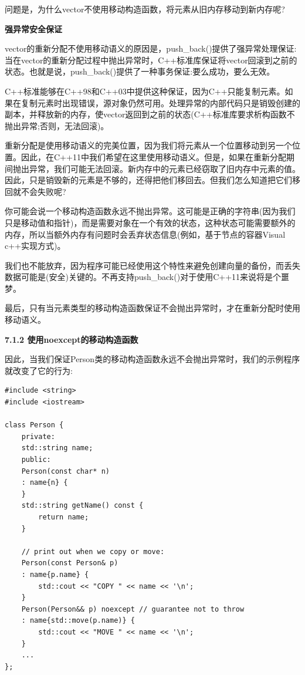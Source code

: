 问题是，为什么vector不使用移动构造函数，将元素从旧内存移动到新内存呢?\par

\hspace*{\fill} \par %
\textbf{强异常安全保证}

vector的重新分配不使用移动语义的原因是，push\_back()提供了强异常处理保证:当在vector的重新分配过程中抛出异常时，C++标准库保证将vector回滚到之前的状态。也就是说，push\_back()提供了一种事务保证:要么成功，要么无效。\par

C++标准能够在C++98和C++03中提供这种保证，因为C++只能复制元素。如果在复制元素时出现错误，源对象仍然可用。处理异常的内部代码只是销毁创建的副本，并释放新的内存，使vector返回到之前的状态(C++标准库要求析构函数不抛出异常;否则，无法回滚)。\par

重新分配是使用移动语义的完美位置，因为我们将元素从一个位置移动到另一个位置。因此，在C++11中我们希望在这里使用移动语义。但是，如果在重新分配期间抛出异常，我们可能无法回滚。新内存中的元素已经窃取了旧内存中元素的值。因此，只是销毁新的元素是不够的，还得把他们移回去。但我们怎么知道把它们移回就不会失败呢?\par

你可能会说一个移动构造函数永远不抛出异常。这可能是正确的字符串(因为我们只是移动值和指针)，而是需要对象在一个有效的状态，这种状态可能需要额外的内存，所以当额外内存有问题时会丢弃状态信息(例如，基于节点的容器Visual c++实现方式)。\par

我们也不能放弃，因为程序可能已经使用这个特性来避免创建向量的备份，而丢失数据可能是(安全)关键的。不再支持push\_back()对于使用C++11来说将是个噩梦。\par

最后，只有当元素类型的移动构造函数保证不会抛出异常时，才在重新分配时使用移动语义。\par

\hspace*{\fill} \par %
\textbf{7.1.2 使用noexcept的移动构造函数}

因此，当我们保证Person类的移动构造函数永远不会抛出异常时，我们的示例程序就改变了它的行为:\par

{\color{red}{basics/personmove.hpp}}\par

\begin{lstlisting}[caption={}]
#include <string>
#include <iostream>

class Person {
	private:
	std::string name;
	public:
	Person(const char* n)
	: name{n} {
	}
	std::string getName() const {
		return name;
	}

	// print out when we copy or move:
	Person(const Person& p)
	: name{p.name} {
		std::cout << "COPY " << name << '\n';
	}
	Person(Person&& p) noexcept // guarantee not to throw
	: name{std::move(p.name)} {
		std::cout << "MOVE " << name << '\n';
	}
	...
};
\end{lstlisting}

